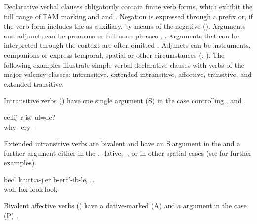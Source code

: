 Declarative verbal clauses obligatorily contain finite verb forms, which exhibit the full range of TAM marking and  and . Negation is expressed through a prefix or, if the verb form includes the  as auxiliary, by means of the negative  (). Arguments and adjuncts can be pronouns or full noun phrases , . Arguments that can be interpreted through the context are often omitted . Adjuncts can be instruments, companions or express temporal, spatial or other circumstances (, ). The following examples illustrate simple verbal declarative clauses with verbs of the major valency classes: intransitive, extended intransitive, affective, transitive, and extended transitive. 

Intransitive verbs () have one single argument (S) in the  case controlling ,  and  .

\begin{exe}
	\ex	\label{ex:She is crying.Why}
	\gll	cellij r-isː-ul=de?	\\
		why -cry- 	\\
	\glt	{}
\end{exe}

Extended intransitive verbs are bivalent and have an S argument in the  and a further argument either in the , -lative, -, or in other spatial cases  (see  for further examples).

\begin{exe}
	\ex	\label{ex:The wolf looked at the fox}
	\gll	bec'	kːurtːa-j er	b-erč'-ib-le, \ldots	\\
		wolf	fox look	look	\\
	\glt	{}
\end{exe}

Bivalent affective verbs () have a dative-marked  (A) and a  argument in the  case (P) .

